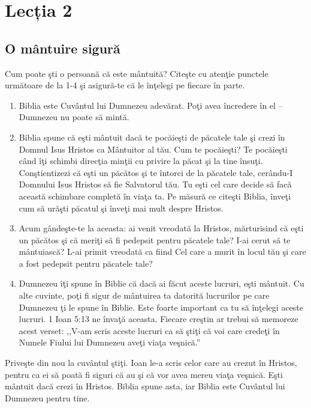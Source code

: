 \newpage

\section*{Lecția 2}

\subsection*{O mântuire sigură}

Cum poate şti o persoană că este mântuită? Citeşte cu atenţie punctele următoare de la 1-4 şi asigură-te că le înţelegi pe fiecare în parte.

\begin{enumerate}
	\item Biblia este Cuvântul lui Dumnezeu adevărat. Poţi avea încredere în el – Dumnezeu nu poate să mintă.
	
	\item Biblia spune că eşti mântuit dacă te pocăieşti de păcatele tale şi crezi în Domnul Isus Hristos ca Mântuitor al tău. Cum te pocăieşti? Te pocăieşti când îţi schimbi direcţia minţii cu privire la păcat şi la tine însuţi. Conştientizezi că eşti un păcătos şi te întorci de la păcatele tale, cerându-I Domnului Isus Hristos să fie Salvatorul tău. Tu eşti cel care decide să facă această schimbare completă în viaţa ta. Pe măsură ce citeşti Biblia, înveţi cum să urăşti păcatul şi înveţi mai mult despre Hristos.
	
	\item Acum gândeşte-te la aceasta: ai venit vreodată la Hristos, mărturisind că eşti un păcătos şi că meriţi să fi pedepsit pentru păcatele tale? I-ai cerut să te mântuiască? L-ai primit vreodată ca fiind Cel care a murit în locul tău şi care a fost pedepsit pentru păcatele tale?
	
	\item Dumnezeu îţi spune în Biblie că dacă ai făcut aceste lucruri, eşti mântuit. Cu alte cuvinte, poţi fi sigur de mântuirea ta datorită lucrurilor pe care Dumnezeu ţi le spune în Biblie. Este foarte important ca tu să înţelegi aceste lucruri. 1 Ioan 5:13 ne învaţă aceasta. Fiecare creştin ar trebui să memoreze acest verset: ,,V-am scris aceste lucruri ca să ştiţi că voi care credeţi în Numele Fiului lui Dumnezeu aveţi viaţa veşnică.''
\end{enumerate}

Priveşte din nou la cuvântul ştiţi. Ioan le-a scris celor care au crezut în Hristos, pentru ca ei să poată fi siguri că au şi că vor avea mereu viaţa veşnică. Eşti mântuit dacă crezi în Hristos. Biblia spune asta, iar Biblia este Cuvântul lui Dumnezeu pentru tine.

